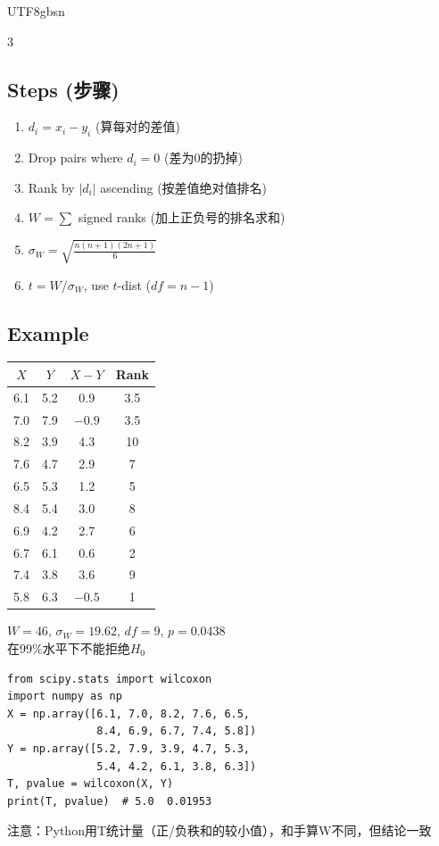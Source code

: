 \documentclass[10pt,landscape,a4paper]{article}
\newcommand{\zhint}[1]{{\scriptsize\color{gray!70!black}#1}}
\begin{document}
\begin{CJK}{UTF8}{gbsn}
\begin{multicols}{3}
\subsection{Steps \zhint{(步骤)}}
\begin{enumerate}[leftmargin=*, nosep, itemsep=1pt]
    \item $d_i = x_i - y_i$ \zhint{(算每对的差值)}
    \item Drop pairs where $d_i = 0$ \zhint{(差为0的扔掉)}
    \item Rank by $|d_i|$ ascending \zhint{(按差值绝对值排名)}
    \item $W = \sum$ signed ranks \zhint{(加上正负号的排名求和)}
    \item $\sigma_W = \sqrt{\frac{n(n+1)(2n+1)}{6}}$
    \item $t = W / \sigma_W$, use $t$-dist ($df = n-1$)
\end{enumerate}

\subsection{Example}
\begin{center}
\scriptsize
\begin{tabular}{cccc}
\toprule
$X$ & $Y$ & $X-Y$ & Rank \\
\midrule
6.1 & 5.2 & 0.9 & 3.5 \\
7.0 & 7.9 & $-0.9$ & 3.5 \\
8.2 & 3.9 & 4.3 & 10 \\
7.6 & 4.7 & 2.9 & 7 \\
6.5 & 5.3 & 1.2 & 5 \\
8.4 & 5.4 & 3.0 & 8 \\
6.9 & 4.2 & 2.7 & 6 \\
6.7 & 6.1 & 0.6 & 2 \\
7.4 & 3.8 & 3.6 & 9 \\
5.8 & 6.3 & $-0.5$ & 1 \\
\bottomrule
\end{tabular}
\end{center}

$W = 46$, $\sigma_W = 19.62$, $df = 9$, $p = 0.0438$\\
\zhint{在99\%水平下不能拒绝$H_0$}

\begin{lstlisting}
from scipy.stats import wilcoxon
import numpy as np
X = np.array([6.1, 7.0, 8.2, 7.6, 6.5,
              8.4, 6.9, 6.7, 7.4, 5.8])
Y = np.array([5.2, 7.9, 3.9, 4.7, 5.3,
              5.4, 4.2, 6.1, 3.8, 6.3])
T, pvalue = wilcoxon(X, Y)
print(T, pvalue)  # 5.0  0.01953
\end{lstlisting}
\zhint{注意：Python用T统计量（正/负秩和的较小值），和手算W不同，但结论一致}


\end{multicols}
\end{CJK}
\end{document}
